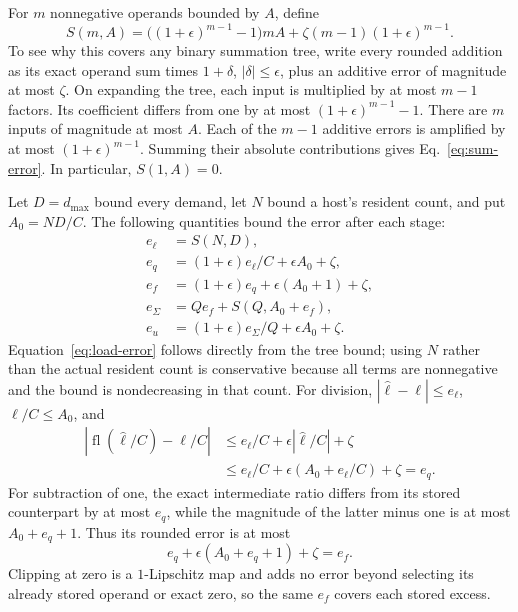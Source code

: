 \documentclass[11pt]{article}
\begin{document}
For $m$ nonnegative operands bounded by $A$, define
\begin{equation}
 S(m,A)=\bigl((1+\epsilon)^{m-1}-1\bigr)mA+\zeta(m-1)(1+\epsilon)^{m-1}.
 \label{eq:sum-error}
\end{equation}
To see why this covers any binary summation tree, write every rounded addition as its exact operand sum times $1+\delta$, $|\delta|\le\epsilon$, plus an additive error of magnitude at most $\zeta$. On expanding the tree, each input is multiplied by at most $m-1$ factors. Its coefficient differs from one by at most $(1+\epsilon)^{m-1}-1$. There are $m$ inputs of magnitude at most $A$. Each of the $m-1$ additive errors is amplified by at most $(1+\epsilon)^{m-1}$. Summing their absolute contributions gives Eq.~\eqref{eq:sum-error}. In particular, $S(1,A)=0$.

Let $D=d_{\max}$ bound every demand, let $N$ bound a host's resident count, and put $A_0=ND/C$. The following quantities bound the error after each stage:
\begin{align}
 e_\ell&=S(N,D),\label{eq:load-error}\\
 e_q&=(1+\epsilon)e_\ell/C+\epsilon A_0+\zeta,\label{eq:division-error}\\
 e_f&=(1+\epsilon)e_q+\epsilon(A_0+1)+\zeta,\label{eq:clipping-error}\\
 e_\Sigma&=Qe_f+S(Q,A_0+e_f),\label{eq:excess-sum-error}\\
 e_u&=(1+\epsilon)e_\Sigma/Q+\epsilon A_0+\zeta.\label{eq:raw-error}
\end{align}
Equation~\eqref{eq:load-error} follows directly from the tree bound; using $N$ rather than the actual resident count is conservative because all terms are nonnegative and the bound is nondecreasing in that count. For division, $|\widehat\ell-\ell|\le e_\ell$, $\ell/C\le A_0$, and
\begin{align}
 |\operatorname{fl}(\widehat\ell/C)-\ell/C|
 &\le e_\ell/C+\epsilon|\widehat\ell/C|+\zeta\\
 &\le e_\ell/C+\epsilon(A_0+e_\ell/C)+\zeta=e_q.
\end{align}
For subtraction of one, the exact intermediate ratio differs from its stored counterpart by at most $e_q$, while the magnitude of the latter minus one is at most $A_0+e_q+1$. Thus its rounded error is at most
\begin{equation}
 e_q+\epsilon(A_0+e_q+1)+\zeta=e_f.
\end{equation}
Clipping at zero is a $1$-Lipschitz map and adds no error beyond selecting its already stored operand or exact zero, so the same $e_f$ covers each stored excess.
\end{document}
